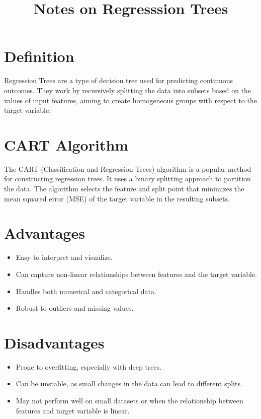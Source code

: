\documentclass[conference]{IEEEtran}
\title{Notes on Regresssion Trees}
\author{
\IEEEauthorblockN{Luis Mendez}
}
\begin{document}
\maketitle

\section*{Definition}
Regression Trees are a type of decision tree used for predicting continuous outcomes. They work by recursively splitting the data into subsets based on the values of input features, aiming to create homogeneous groups with respect to the target variable.


\section*{CART Algorithm}
The CART (Classification and Regression Trees) algorithm is a popular method for constructing regression trees. It uses a binary splitting approach to partition the data. The algorithm selects the feature and split point that minimizes the mean squared error (MSE) of the target variable in the resulting subsets.
\section*{Advantages}
\begin{itemize}
    \item Easy to interpret and visualize.
    \item Can capture non-linear relationships between features and the target variable.
    \item Handles both numerical and categorical data.
    \item Robust to outliers and missing values.
\end{itemize}
\section*{Disadvantages}
\begin{itemize}
    \item Prone to overfitting, especially with deep trees.
    \item Can be unstable, as small changes in the data can lead to different splits.
    \item May not perform well on small datasets or when the relationship between features and target variable is linear.
\end{itemize}
\end{document}
